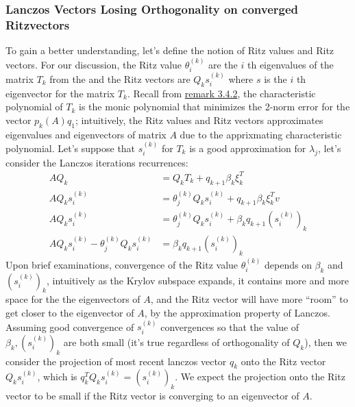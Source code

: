 \documentclass[]{article}
\theoremstyle{definition}
\begin{document}
        \subsubsection{Lanczos Vectors Losing Orthogonality on converged Ritzvectors}
            To gain a better understanding, let's define the notion of Ritz values and Ritz vectors. For our discussion, the Ritz value $\theta_i^{(k)}$ are the $i$ th eigenvalues of the matrix $T_k$ from the and the Ritz vectors are $Q_ks_{i}^{(k)}$ where $s$ is the $i$ th eigenvector for the matrix $T_k$. Recall from \hyperref[remark:Minimal_Polynomial_from_Lanczos_Iterations]{remark 3.4.2}, the characteristic polynomial of $T_k$ is the monic polynomial that minimizes the 2-norm error for the vector $p_k(A)q_1$; intuitively, the Ritz values and Ritz vectors approximates eigenvalues and eigenvectors of matrix $A$ due to the apprixmating characteristic polynomial. Let's suppose that $s_i^{(k)}$ for $T_k$ is a good approximation for $\lambda_j$, let's consider the Lanczos iterations recurrences: 
            \begin{align}
                AQ_k &= Q_k T_k + q_{k + 1}\beta_k\xi_k^T
                \\
                AQ_ks_i^{(k)} &= \theta_j^{(k)} Q_k s_i^{(k)} + q_{k + 1}\beta_k \xi_k^Tv
                \\
                AQ_ks_i^{(k)} &= \theta_j^{(k)} Q_k s_i^{(k)} + \beta_kq_{k + 1}(s_i^{(k)})_k
                \\
                AQ_ks_i^{(k)} - \theta_j^{(k)} Q_k s_i^{(k)} &=   \beta_kq_{k + 1}(s_i^{(k)})_k
            \end{align}
            Upon brief examinations, convergence of the Ritz value $\theta_{i}^{(k)}$ depends on $\beta_k$ and $(s_i^{(k)})_k$, intuitively as the Krylov subspace expands, it contains more and more space for the the eigenvectors of $A$, and the Ritz vector will have more ``room'' to get closer to the eigenvector of $A$, by the approximation property of Lanczos. Assuming good convergence of $s_i^{(k)}$ convergences so that the value of $\beta_k, (s_i^{(k)})_k$ are both small (it's true regardless of orthogonality of $Q_k$), then we consider the projection of most recent lanczos vector $q_k$ onto the Ritz vector $Q_ks_i^{(k)}$, which is $q_k^TQ_ks_i^{(k)} = (s_i^{(k)})_k$. We expect the projection onto the Ritz vector to be small if the Ritz vector is converging to an eigenvector of $A$.  
            \par
\end{document}
